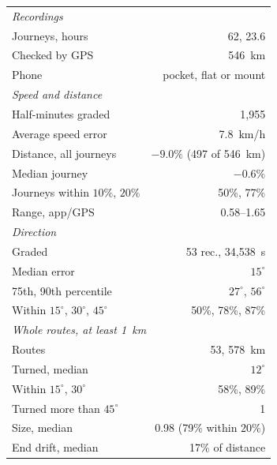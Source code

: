 \begin{tabular}{@{}lr@{}}
\toprule
\multicolumn{2}{l}{\emph{Recordings}} \\
Journeys, hours & 62, 23.6 \\
Checked by GPS & 546~km \\
Phone & pocket, flat or mount \\
\midrule\multicolumn{2}{l}{\emph{Speed and distance}} \\
Half-minutes graded & 1{,}955 \\
Average speed error & 7.8~km/h \\
Distance, all journeys & $-9.0\%$ (497 of 546~km) \\
Median journey & $-0.6\%$ \\
Journeys within $10\%$, $20\%$ & 50\%, 77\% \\
Range, app/GPS & 0.58--1.65 \\
\midrule\multicolumn{2}{l}{\emph{Direction}} \\
Graded & 53 rec., 34{,}538~s \\
Median error & $15^\circ$ \\
75th, 90th percentile & $27^\circ$, $56^\circ$ \\
Within $15^\circ$, $30^\circ$, $45^\circ$ & 50\%, 78\%, 87\% \\
\midrule\multicolumn{2}{l}{\emph{Whole routes, at least 1~km}} \\
Routes & 53, 578~km \\
Turned, median & $12^\circ$ \\
Within $15^\circ$, $30^\circ$ & 58\%, 89\% \\
Turned more than $45^\circ$ & 1 \\
Size, median & 0.98 (79\% within $20\%$) \\
End drift, median & 17\% of distance \\
\bottomrule
\end{tabular}
